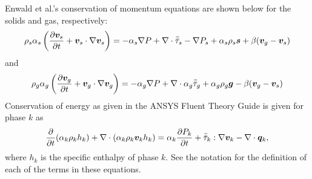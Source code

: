 Enwald et al.'s \cite{enwald96} conservation of momentum equations are shown below for the solids and gas, respectively:
\begin{equation}\label{eq:momentum_s}
	\rho_{s}\alpha_{s}\left(\frac{\partial\boldsymbol{v}_{s}}{\partial t}
	+\boldsymbol{v}_{s}\cdot\nabla\boldsymbol{v}_{s}\right)
	=
	-\alpha_{s}\nabla{P}+\nabla\cdot\bar{\bar{\tau}}_{s}-\nabla{P_s}
	+\alpha_{s}\rho_{s}\boldsymbol{s}
	+\beta(\boldsymbol{v}_{g}
	-\boldsymbol{v}_{s})
\end{equation}
and
\begin{equation}\label{eq:momentum_g}
	\rho_{g}\alpha_{g}\left(\frac{\partial\boldsymbol{v}_{g}}{\partial t}
	+\boldsymbol{v}_{g}\cdot\nabla\boldsymbol{v}_{g}\right)
	=-\alpha_{g}\nabla{P}+\nabla\cdot\alpha_{g}\bar{\bar{\tau}}_{g}
	+\alpha_{g}\rho_{g}\boldsymbol{g}
	-\beta(\boldsymbol{v}_{g}
	-\boldsymbol{v}_{s})
\end{equation}
Conservation of energy as given in the ANSYS Fluent Theory Guide \cite{fluenttheoryguide09} is given for phase $k$ as
\begin{equation}\label{eq:energy_k}
\frac{\partial}{\partial t}(\alpha_k\rho_k h_k)+\nabla\cdot(\alpha_k\rho_k\boldsymbol{v}_k h_k)=\alpha_k\frac{\partial P_k}{\partial t}+\bar{\bar{\tau}}_{k}:\nabla{\boldsymbol{v}_k}-\nabla\cdot\boldsymbol{q}_k,
\end{equation}
where $h_k$ is the specific enthalpy of phase $k$. See the notation for the definition of each of the terms in these equations.
%
%
%
%
%
%
%
%
%
%


\begin{comment}
\begin{figure}[h]
	\centering
	\texttt{[image: blank.eps]}
	\caption{Template for a figure, you will need to add the figure.}
	\label{fig:blank}
\end{figure}
I refer to a figure with \ref{fig:blank}.
\end{comment}

\newpage
\printnomenclature





